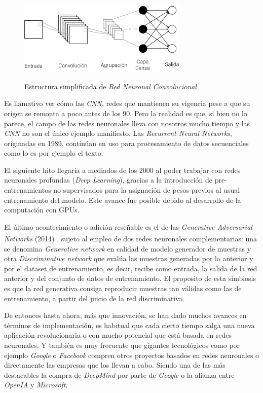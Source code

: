 \begin{figure}[h]
    \centering
    \includegraphics[width=0.72\textwidth]{capturas/CNN.png}\\[-0,20cm]
    \caption{Estructura simplificada de \textit{Red Neuronal Convolucional}}
\end{figure}

Es llamativo ver cómo las \textit{CNN}, redes que mantienen su vigencia
pese a que su origen se remonta a poco antes de los 90. Pero la realidad es
que, si bien no lo parece, el campo de las redes neuronales lleva con nosotros
mucho tiempo y las \textit{CNN} no son el único ejemplo manifiesto.
Las \textit{Recurrent Neural Networks}, originadas en 1989, continúan en
uso para procesamiento de datos secuenciales como lo es por ejemplo el texto.


El siguiente hito llegaría a mediados de los 2000 al poder trabajar
con redes neuronales profundas (\textit{Deep Learning}), gracias a la
introducción de pre-entrenamientos no supervisados para la asignación
de pesos previos al usual entrenamiento del modelo. Este avance fue
posible debido al desarrollo de la computación con GPUs.


El último acontecimiento o adición reseñable es el de las
\textit{Generative Adversarial Networks} (2014)
\textsuperscript{\cite{genAd}}, sujeto al empleo de dos
redes neuronales complementarias: una se denomina \textit{Generative network}
en calidad de modelo generador de muestras y otra \textit{Discriminative network}
que evalúa las muestras generadas por la anterior y por el dataset de entrenamiento,
es decir, recibe como entrada, la salida de la red anterior y del conjunto
de datos de entrenamiento. El proposito de esta simbiosis es que la red
generativa consiga reproducir muestras tan válidas como las de entrenamiento,
a partir del juicio de la red discriminativa.


De entonces hasta ahora, más que innovación, se han dado muchos avances
en términos de implementación, es habitual que cada cierto tiempo salga
una nueva aplicación revolucionaria o con mucho potencial que está basada
en redes neuronales. Y también es muy frecuente que gigantes tecnológicos
como por ejemplo \textit{Google} o \textit{Facebook} compren otros
proyectos basados en redes neuronales o directamente las empresas
que los llevan a cabo. Siendo una de las más destacables la compra de
\textit{DeepMind} por parte de \textit{Google} o la alianza entre
\textit{OpenIA} y \textit{Microsoft}.


